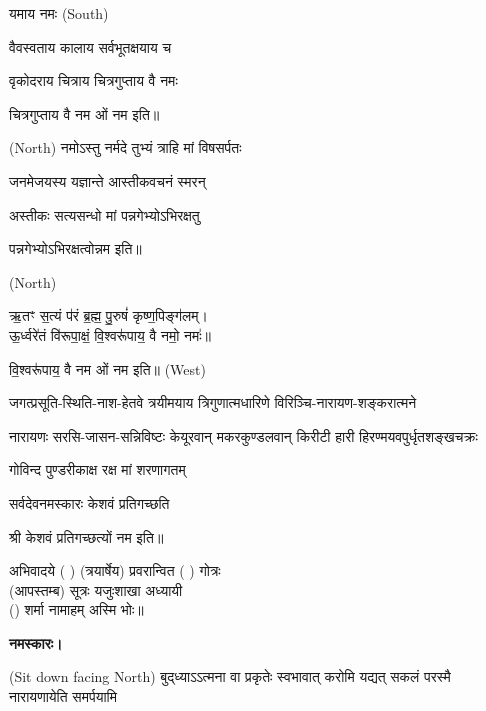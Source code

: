 यमाय नमः   {\scriptsize (South)}

{वैवस्वताय   कालाय   सर्वभूतक्षयाय   च}

{वृकोदराय   चित्राय   चित्रगुप्ताय   वै  नमः}

चित्रगुप्ताय   वै  नम ओं नम इति॥

 {\scriptsize (North)}
{नमोऽस्तु नर्मदे तुभ्यं त्राहि मां विषसर्पतः}

{जनमेजयस्य यज्ञान्ते आस्तीकवचनं स्मरन्}


{अस्तीकः सत्यसन्धो मां पन्नगेभ्योऽभिरक्षतु}

पन्नगेभ्योऽभिरक्षत्वोन्नम इति॥

 {\scriptsize (North)}

ऋ॒तꣳ स॒त्यं प॑रं ब्र॒ह्म॒ पु॒रुषं॑ कृष्ण॒पिङ्ग॑लम्।\\
ऊ॒र्ध्वरे॑तं वि॑रूपा॒क्षं॒ वि॒श्वरू॑पाय॒ वै नमो॒ नमः॑॥


वि॒श्वरू॑पाय॒ वै नम ओं नम इति॥
{\scriptsize (West)}

{जगत्प्रसूति-स्थिति-नाश-हेतवे}
{त्रयीमयाय त्रिगुणात्मधारिणे}
{विरिञ्चि-नारायण-शङ्करात्मने}

{नारायणः सरसि-जासन-सन्निविष्टः}
{केयूरवान् मकरकुण्डलवान् किरीटी}
{हारी हिरण्मयवपुर्धृतशङ्खचक्रः}

{गोविन्द पुण्डरीकाक्ष रक्ष मां शरणागतम्}

{सर्वदेवनमस्कारः केशवं प्रतिगच्छति}

श्री केशवं प्रतिगच्छत्यों नम इति॥

अभिवादये ( ) (त्रयार्षेय) प्रवरान्वित ( ) गोत्रः\\
(आपस्तम्ब) सूत्रः यजुःशाखा अध्यायी\\
() शर्मा नामाहम् अस्मि भोः॥

\textbf{नमस्कारः।}


{\scriptsize (Sit down facing North)}
{बुद्‌ध्याऽऽत्मना वा प्रकृतेः स्वभावात्}
{करोमि यद्यत् सकलं परस्मै}
{नारायणायेति समर्पयामि}

